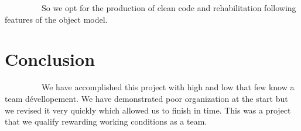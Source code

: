 \documentclass[11pt]{report}
\begin{document}
~~~~~~~~~So we opt for the production of clean code and rehabilitation following features of the object model.

 \chapter*{Conclusion}  

~~~~~~~~~We have accomplished this project with high and low that few know a team d\'{e}vellopement.
We have demonstrated poor organization at the start but we revised it very quickly which allowed us to finish in time.
This was a project that we qualify rewarding working conditions as a team.
\end{document}

